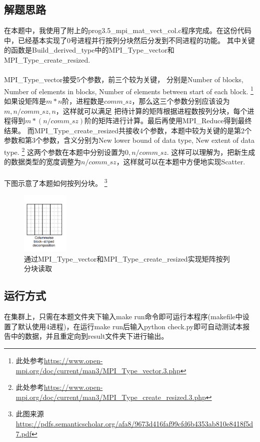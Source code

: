 \documentclass[UTF8]{article}
\begin{document}
\subsection{解题思路}
在本题中，我使用了附上的prog3.5\_mpi\_mat\_vect\_col.c程序完成。在这份代码中，已经基本实现了0号进程并行按列分块然后分发到不同进程的功能。
其中关键的函数是Build\_derived\_type中的MPI\_Type\_vector和MPI\_Type\_create\_resized. 
\\\\
MPI\_Type\_vector接受5个参数，前三个较为关键，
分别是Number of blocks, Number of elements in blocks, Number of elements between start of each block.
 \footnote{此处参考\url{https://www.open-mpi.org/doc/current/man3/MPI_Type_vector.3.php}} 
如果设矩阵是$m*n$阶，进程数是$comm\_sz$，那么这三个参数分别应该设为$m, n/comm\_sz, n$，这样就可以满足
把待计算的矩阵根据进程数按列分块，每个进程得到$m * (n/comm\_sz)$阶的矩阵进行计算。最后再使用MPI\_Reduce得到最终结果。
而MPI\_Type\_create\_resized共接收4个参数，本题中较为关键的是第2个参数和第3个参数，含义分别为New lower bound of data type, New extent of data type. 
\footnote{此处参考\url{https://www.open-mpi.org/doc/current/man3/MPI_Type_create_resized.3.php}}
这两个参数在本题中分别设置为$0, n/comm\_sz$. 这样可以理解为，把新生成的数据类型的宽度调整为$n/comm\_sz$，这样就可以在本题中方便地实现Scatter.
\\\\

下图示意了本题如何按列分块。
\footnote{此图来源\url{https://pdfs.semanticscholar.org/afa8/9673d416faf99cfd6b4353ab810e8418f5d7.pdf}}
\begin{figure}[h]
    \centering
    \includegraphics[width=0.2\textwidth]{cw.png}
    \caption{通过MPI\_Type\_vector和MPI\_Type\_create\_resized实现矩阵按列分块读取}
\end{figure}
\subsection{运行方式}
在集群上，只需在本题文件夹下输入make run命令即可运行本程序(makefile中设置了默认使用4进程)，在运行make run后输入python check.py即可自动测试本报告中的数据，并且重定向到result文件夹下进行输出。
\clearpage
\end{document}
